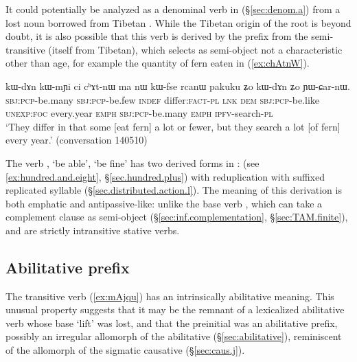 It could potentially be analyzed as a denominal verb in  (§\ref{sec:denom.a}) from a lost noun  borrowed from Tibetan . While the Tibetan origin of the root is beyond doubt, it is also possible that this verb is derived by the  prefix from the semi-transitive  (itself from Tibetan), which selects as semi-object not a characteristic other than age, for example the quantity of fern eaten in (\ref{ex:chAtnW}).

\begin{exe}
\ex \label{ex:chAtnW} 
\gll kɯ-dɤn kɯ-mɲi ci cʰɤt-nɯ ma nɯ kɯ-fse rcanɯ pakuku ʑo kɯ-dɤn ʑo ɲɯ-ɕar-nɯ.  \\
\textsc{sbj}:\textsc{pcp}-be.many \textsc{sbj}:\textsc{pcp}-be.few \textsc{indef} differ:\textsc{fact}-\textsc{pl} \textsc{lnk} \textsc{dem} \textsc{sbj}:\textsc{pcp}-be.like \textsc{unexp}:\textsc{foc} every.year \textsc{emph} \textsc{sbj}:\textsc{pcp}-be.many \textsc{emph} \textsc{ipfv}-search-\textsc{pl} \\
\glt `They differ in that some [eat fern] a lot or fewer, but they search a lot [of fern] every year.' (conversation 140510)
\end{exe}

The verb , `be able', `be fine' has two derived forms in :  (see \ref{ex:hundred.and.eight}, §\ref{sec.hundred.plus}) with reduplication  with suffixed  replicated syllable (§\ref{sec.distributed.action.l}). The meaning of this derivation is both emphatic and antipassive-like: unlike the base verb , which can take a complement clause as semi-object (§\ref{sec:inf.complementation}, §\ref{sec:TAM.finite}),  and  are strictly intransitive stative verbs.

\subsection{Abilitative  prefix  } \label{sec:j.abilitative}
The transitive verb  (\ref{ex:mAjqu}) has an intrinsically abilitative meaning. This unusual property suggests that it may be the remnant of a lexicalized abilitative verb whose base  `lift' was lost, and that the  preinitial was an abilitative prefix, possibly an irregular allomorph of the  abilitative (§\ref{sec:abilitative}), reminiscent of the  allomorph of the sigmatic causative (§\ref{sec:caus.j}).

